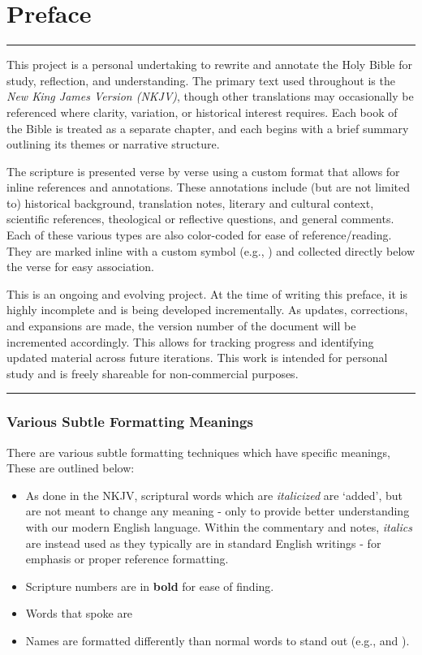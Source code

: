 \chapter{Preface}
\rule{\textwidth}{0.5pt}    %
\thispagestyle{fancy}

This project is a personal undertaking to rewrite and annotate the Holy Bible for study, reflection, and understanding. The primary text used throughout is the \textit{New King James Version (NKJV)}, though other translations may occasionally be referenced where clarity, variation, or historical interest requires. Each book of the Bible is treated as a separate chapter, and each begins with a brief summary outlining its themes or narrative structure.

\tab The scripture is presented verse by verse using a custom format that allows for inline references and annotations. These annotations include (but are not limited to) historical background, translation notes, literary and cultural context, scientific references, theological or reflective questions, and general comments. Each of these various types are also color-coded for ease of reference/reading. They are marked inline with a custom symbol (e.g., \vmark{$\star$}) and collected directly below the verse for easy association.

\tab This is an ongoing and evolving project. At the time of writing this preface, it is highly incomplete and is being developed incrementally. As updates, corrections, and expansions are made, the version number of the document will be incremented accordingly. This allows for tracking progress and identifying updated material across future iterations. This work is intended for personal study and is freely shareable for non-commercial purposes.

\rule{\textwidth}{0.5pt}    %


\subsection*{Various Subtle Formatting Meanings}

There are various subtle formatting techniques which have specific meanings, These are outlined below:
\begin{itemize}
	\item As done in the NKJV, scriptural words which are \textit{italicized} are `added', but are not meant to change any meaning - only to provide better understanding with our modern English language. Within the commentary and notes, \textit{italics} are instead used as they typically are in standard English writings - for emphasis or proper reference formatting.
	\item Scripture numbers are in \textbf{bold} for ease of finding.
	\item Words that  spoke are 
	\item Names are formatted differently than normal words to stand out (e.g., \Moses and \Abraham).
\end{itemize}





